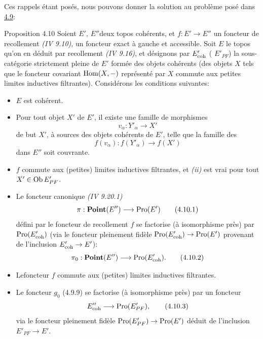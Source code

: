\documentclass[10pt]{../fichiers-configuration-latex/smfart}
\begin{document}
Ces rappels étant posés, nous pouvons donner la solution au problème
posé dans \hyperref[VI.subsec4.9]{4.9}:

\begin{enonce*}{Proposition 4.10}
Soient $E'$, $E''$\pageoriginale deux topos cohérents, et $f : E'\to
E''$ un foncteur de recollement \emph{(IV 9.10)}, \ie un foncteur
exact à gauche et accessible. Soit $E$ le topos qu'on en déduit par
recollement \emph{(IV 9.16)}, et désignons par $E'_{\mathrm{coh}}$ (\resp
$E'_{PF}$) la sous-catégorie strictement pleine de $E'$ formée des
objets cohérents (\resp des objets $X$ tels que le foncteur
covariant $\operatorname{Hom}(X, -)$ représenté par $X$ commute aux petites
limites inductives filtrantes). Considérons les conditions
suivantes:
\begin{itemize}
\item[(i)] $E$ est cohérent.

\item[(ii)] Pour tout objet $X'$ de $E'$, il existe une famille de
  morphismes
$$
v_{\alpha} : Y'_{\alpha} \to X'
$$
de but $X'$, à sources des objets cohérents de $E'$, telle que la
famille des
$$
f(v_{\alpha}) : f(Y'_{\alpha}) \to f(X')
$$
dans $E''$ soit couvrante.

\item[(ii bis)] $f$ commute aux (petites) limites inductives
  filtrantes, et \emph{(ii)} est vrai pour tout $X'\in \operatorname{Ob} E'_{PF}$.

\item[(ii ter)] Le foncteur canonique \emph{(IV 9.20.1)}
\begin{equation*}
\pi : \Ppoint(E'') \to \Pro(E')\tag{4.10.1}
\end{equation*}
défini par le foncteur de recollement $f$ se factorise (à isomorphisme
près) par $\operatorname{Pro}(E'_{\mathrm{coh}})$ (via le foncteur pleinement fidèle
$\Pro(E'_{\coh}) \to \Pro(E')$ provenant de l'inclusion $E'_{\coh}
\to E'$):
\begin{equation*}
\pi_0 : \Ppoint (E'') \to \Pro(E'_{\coh}){\quoi}.\tag{4.10.2}
\end{equation*}

\item[(iii)] Le\pageoriginale foncteur $f$ commute aux (petites)
  limites inductives
  filtrantes.

\item[(iii bis)] Le foncteur $g_0$ (4.9.9) se factorise (à
  isomorphisme près) par un foncteur
\begin{equation*}
E''_{\coh} \to \Pro(E'_{PF}){\quoi},\tag{4.10.3}
\end{equation*}
via le foncteur pleinement fidèle $\Pro(E'_{PF}) \to \Pro(E')$ déduit
de l'inclusion $E'_{PF} \to E'$.


\end{itemize}
\end{enonce*}
\end{document}
